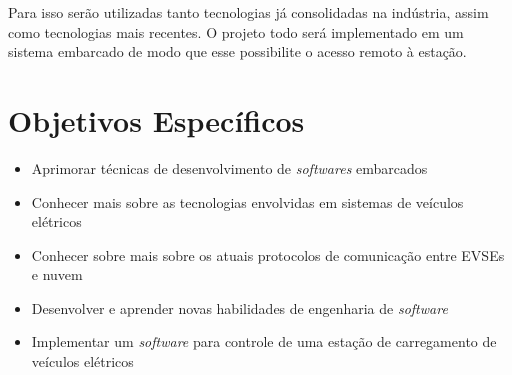 Para isso serão utilizadas tanto tecnologias já consolidadas na indústria, assim como tecnologias mais recentes. O projeto todo será implementado em um sistema embarcado de modo que esse possibilite o acesso remoto à estação.

\section{Objetivos Específicos}

\begin{itemize}
  \item Aprimorar técnicas de desenvolvimento de \textit{softwares} embarcados
  \item Conhecer mais sobre as tecnologias envolvidas em sistemas de veículos elétricos
  \item Conhecer sobre mais sobre os atuais protocolos de comunicação entre EVSEs e nuvem
  \item Desenvolver e aprender novas habilidades de engenharia de \textit{software}
  \item Implementar um \textit{software} para controle de uma estação de carregamento de veículos elétricos
\end{itemize}
